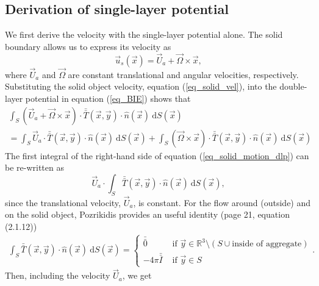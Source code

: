 \subsection{Derivation of single-layer potential}
We first derive the velocity with the single-layer potential alone.
The solid boundary allows us to express its velocity as 
\begin{equation}
	\vec{u}_s \left( \vec{x} \right) 
	= \vec{U}_a + \vec{\Omega} \times \vec{x}  ,
	\label{eq_solid_vel}
\end{equation}
where $\vec{U}_a$ and $\vec{\Omega}$ are constant translational and angular velocities, respectively. 
Substituting the solid object velocity, equation (\ref{eq_solid_vel}), into the double-layer potential in equation (\ref{eq_BIE}) shows that 
\begin{align}
	\int_S
	\left( \vec{U}_a + \vec{\Omega} \times \vec{x} \right)
	 \cdot  \bar{\bar{T}}(\vec{x},\vec{y})  
	\cdot \hat{n} ( \vec{x})
	\ \text{d}S(\vec{x})
    \nonumber \\
	= 
	\int_S
	\vec{U}_a
	 \cdot  \bar{\bar{T}}(\vec{x},\vec{y})  
	\cdot \hat{n} ( \vec{x})
	\ \text{d}S(\vec{x})
     + 	
	\int_S
	\left(  \vec{\Omega} \times \vec{x} \right)
	 \cdot  \bar{\bar{T}}(\vec{x},\vec{y})  
	\cdot \hat{n} ( \vec{x})
	\ \text{d}S(\vec{x})
	\label{eq_solid_motion_dlp}
\end{align}
The first integral of the right-hand side of equation (\ref{eq_solid_motion_dlp}) can be re-written as 
\begin{equation}
	\vec{U}_a \cdot
	\int_S
	  \bar{\bar{T}}(\vec{x},\vec{y})  
	\cdot \hat{n} ( \vec{x})
	\ \text{d}S(\vec{x}),
	\label{eq_solid_motion_dlp_Ua}
\end{equation}
since the translational velocity, $\vec{U}_a$, is constant. 
For the flow around (outside) and on the solid object, Pozrikidis provides an useful identity \cite{pozrikidis_boundary_1992} (page 21, equation (2.1.12))
\begin{align}
	\int_S  \bar{\bar{T}}(\vec{x},\vec{y}) \cdot \hat{n} ( \vec{x})
	\ \text{d}S(\vec{x})
	=
	 \begin{cases}
	 \bar{\bar{0}} & \text{ if } \vec{y} \in \mathbb{R}^3  \setminus  \left( S \cup {\text{inside of aggregate}}\right) 	\\ 
	 - 4\pi \bar{\bar{I}} & \text{ if } \vec{y} \in S 
	 \end{cases}.
	\label{eq_dlp_identity1}
\end{align}
Then, including the velocity $\vec{U}_a$, we get
